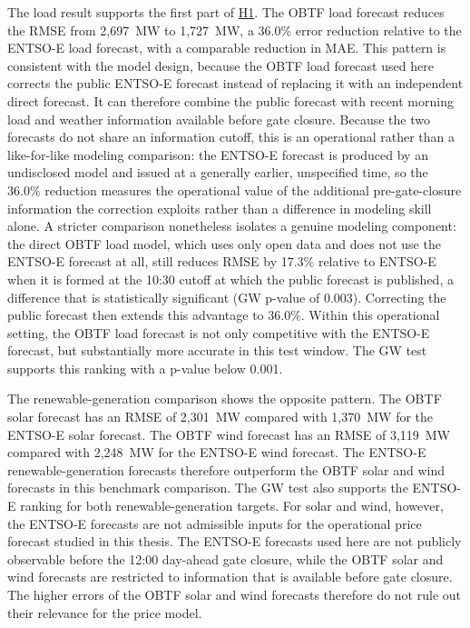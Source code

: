 The load result supports the first part of
\hyperlink{hyp:component_forecast_quality}{H1}. The OBTF load forecast
reduces the RMSE from 2,697~MW to 1,727~MW, a 36.0\%
error reduction relative to the \mbox{ENTSO-E} load forecast, with a comparable
reduction in MAE. This pattern is
consistent with the model design, because the OBTF load forecast used here corrects the public \mbox{ENTSO-E} forecast instead
of replacing it with an independent direct forecast. It can therefore combine
the public forecast with recent morning load and weather information available
before gate closure. Because the two forecasts do not share an information
cutoff, this is an operational rather than a like-for-like modeling comparison:
the \mbox{ENTSO-E} forecast is produced by an undisclosed model and issued at a
generally earlier, unspecified time, so the 36.0\% reduction measures the
operational value of the additional pre-gate-closure information the correction
exploits rather than a difference in modeling skill alone. A stricter comparison
nonetheless isolates a genuine modeling component: the direct OBTF load model, which
uses only open data and does not use the \mbox{ENTSO-E} forecast at all, still
reduces RMSE by 17.3\% relative to \mbox{ENTSO-E} when it is formed at the 10:30
cutoff at which the public forecast is published, a difference that is
statistically significant (GW p-value of 0.003). Correcting the
public forecast then extends this advantage to 36.0\%. Within this
operational setting, the OBTF load forecast is not only
competitive with the \mbox{ENTSO-E} forecast, but substantially more accurate in this
test window. The GW test supports this ranking with a p-value
below 0.001.

The renewable-generation comparison shows the opposite pattern. The OBTF solar forecast
has an RMSE of 2,301~MW compared with 1,370~MW for the \mbox{ENTSO-E} solar
forecast. The OBTF wind forecast has an RMSE of 3,119~MW compared with
2,248~MW for the \mbox{ENTSO-E} wind forecast. The \mbox{ENTSO-E}
renewable-generation forecasts therefore outperform the OBTF solar and
wind forecasts in this benchmark comparison. The GW test also
supports the \mbox{ENTSO-E} ranking for both renewable-generation targets. For
solar and wind, however, the \mbox{ENTSO-E} forecasts are not admissible inputs
for the operational price forecast studied in this thesis. The \mbox{ENTSO-E}
forecasts used here are not publicly observable before the 12:00
day-ahead gate closure, while the OBTF solar and wind forecasts are restricted
to information that is available before gate closure. The higher errors of the OBTF solar and wind
forecasts therefore do not rule out their relevance for the price model.

